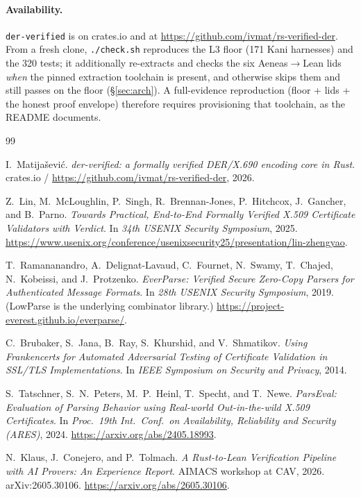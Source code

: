 \documentclass[10pt,twocolumn]{article}
\newcommand{\code}[1]{\texttt{\small #1}}
\newcommand{\crate}{\code{der-verified}}
\begin{document}
\paragraph{Availability.}
\crate{} is on crates.io and at \url{https://github.com/ivmat/rs-verified-der}.
From a fresh clone, \code{./check.sh} reproduces the L3 floor (171 Kani
harnesses) and the 320 tests; it additionally re-extracts and checks the six
Aeneas${\to}$Lean lids \emph{when} the pinned extraction toolchain is present,
and otherwise skips them and still passes on the floor (\S\ref{sec:arch}). A
full-evidence reproduction (floor + lids + the honest proof envelope) therefore
requires provisioning that toolchain, as the README documents.

\begin{thebibliography}{99}
\footnotesize

I.~Matija\v{s}evi\'c.
\emph{der-verified: a formally verified DER/X.690 encoding core in Rust}.
crates.io / \url{https://github.com/ivmat/rs-verified-der}, 2026.

Z.~Lin, M.~McLoughlin, P.~Singh, R.~Brennan-Jones, P.~Hitchcox, J.~Gancher,
and B.~Parno.
\emph{Towards Practical, End-to-End Formally Verified X.509 Certificate
Validators with Verdict}.
In \emph{34th USENIX Security Symposium}, 2025.
\url{https://www.usenix.org/conference/usenixsecurity25/presentation/lin-zhengyao}.

T.~Ramananandro, A.~Delignat-Lavaud, C.~Fournet, N.~Swamy, T.~Chajed,
N.~Kobeissi, and J.~Protzenko.
\emph{EverParse: Verified Secure Zero-Copy Parsers for Authenticated Message
Formats}.
In \emph{28th USENIX Security Symposium}, 2019. (LowParse is the underlying
combinator library.) \url{https://project-everest.github.io/everparse/}.

C.~Brubaker, S.~Jana, B.~Ray, S.~Khurshid, and V.~Shmatikov.
\emph{Using Frankencerts for Automated Adversarial Testing of Certificate
Validation in SSL/TLS Implementations}.
In \emph{IEEE Symposium on Security and Privacy}, 2014.

S.~Tatschner, S.~N.~Peters, M.~P.~Heinl, T.~Specht, and T.~Newe.
\emph{ParsEval: Evaluation of Parsing Behavior using Real-world
Out-in-the-wild X.509 Certificates}.
In \emph{Proc.\ 19th Int.\ Conf.\ on Availability, Reliability and Security
(ARES)}, 2024. \url{https://arxiv.org/abs/2405.18993}.

N.~Klaus, J.~Conejero, and P.~Tolmach.
\emph{A Rust-to-Lean Verification Pipeline with AI Provers: An Experience
Report}.
AIMACS workshop at CAV, 2026. arXiv:2605.30106.
\url{https://arxiv.org/abs/2605.30106}.


\end{thebibliography}
\end{document}

